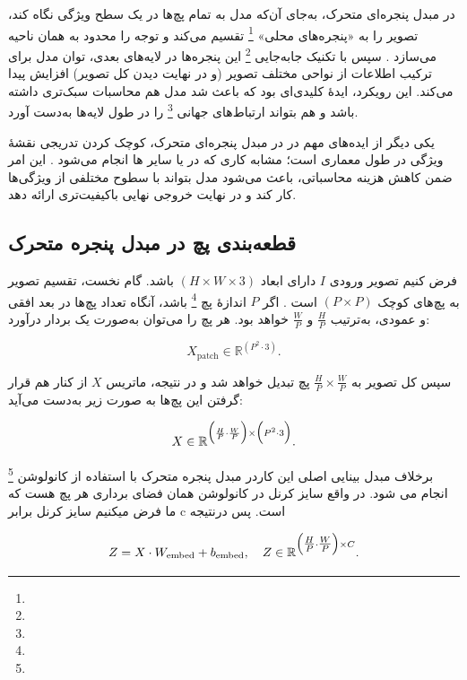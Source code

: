 در مبدل پنجره‌ای متحرک، به‌جای آن‌که مدل به تمام پچ‌ها در یک سطح ویژگی نگاه کند، تصویر را به «پنجره‌های محلی» \footnote{} تقسیم می‌کند و توجه را محدود به همان ناحیه می‌سازد \cite{liu2021swintransformer}. سپس با تکنیک جابه‌جایی \footnote{} این پنجره‌ها در لایه‌های بعدی، توان مدل برای ترکیب اطلاعات از نواحی مختلف تصویر (و در نهایت دیدن کل تصویر) افزایش پیدا می‌کند. این رویکرد، ایدهٔ کلیدی‌ای بود که باعث شد مدل هم محاسبات سبک‌تری داشته باشد و هم بتواند ارتباط‌های جهانی \footnote{} را در طول لایه‌ها به‌دست آورد.



یکی دیگر از ایده‌های مهم در در مبدل پنجره‌ای متحرک، کوچک‌ کردن تدریجی نقشهٔ ویژگی  در طول معماری است؛ مشابه کاری که در  یا سایر ها انجام می‌شود \cite{he2016deep}. این امر ضمن کاهش هزینه محاسباتی، باعث می‌شود مدل بتواند با سطوح مختلفی از ویژگی‌ها کار کند و در نهایت خروجی نهایی باکیفیت‌تری ارائه دهد.

\subsection{قطعه‌بندی پچ در مبدل پنجره متحرک}
فرض کنیم تصویر ورودی \(\displaystyle I\) دارای ابعاد \(\displaystyle (H \times W \times 3)\) باشد. گام نخست، تقسیم تصویر به پچ‌های کوچک \(\displaystyle (P \times P)\) است \cite{dosovitskiy2020image}. اگر \(P\) اندازهٔ پچ \footnote{} باشد، آنگاه تعداد پچ‌ها در بعد افقی و عمودی، به‌ترتیب \(\displaystyle \frac{H}{P}\) و \(\displaystyle \frac{W}{P}\) خواهد بود. هر پچ را می‌توان به‌صورت یک بردار درآورد:

\[
X_{\text{patch}} \in \mathbb{R}^{(P^2 \cdot 3)}.
\]

سپس کل تصویر به \(\displaystyle \frac{H}{P} \times \frac{W}{P}\) پچ تبدیل خواهد شد و در نتیجه، ماتریس \(\displaystyle X\) از کنار هم قرار گرفتن این پچ‌ها به صورت زیر به‌دست می‌آید:

\[
X \in \mathbb{R}^{\Bigl(\frac{H}{P} \cdot \frac{W}{P}\Bigr) \times \Bigl(P^2 \cdot 3\Bigr)}.
\]

برخلاف مبدل بینایی اصلی این کاردر مبدل پنجره متحرک با استفاده از کانولوشن \footnote{} انجام می شود.
در واقع سایز کرنل در کانولوشن همان فضای برداری هر پچ هست که ما فرض میکنیم سایز کرنل برابر c ‌است. پس درنتیجه



\begin{equation}
	Z = X \cdot W_{\text{embed}} + b_{\text{embed}}, 
	\quad
	Z \in \mathbb{R}^{\Bigl(\tfrac{H}{P} \cdot \tfrac{W}{P}\Bigr) \times C}.
\end{equation}

